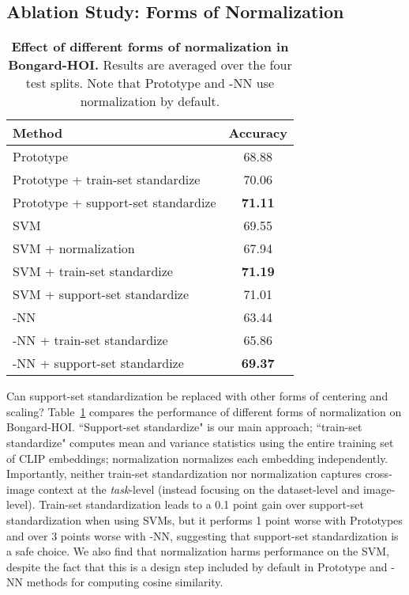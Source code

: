 \subsection{Ablation Study: Forms of Normalization}
\begin{table}
  \centering
    \begin{tabular}{lc}
    \toprule
    Method & Accuracy \\
    \midrule
    Prototype & 68.88  \\
    Prototype + train-set standardize &   70.06  \\
    Prototype + support-set standardize &  \textbf{71.11}  \\
    \midrule
    SVM & 69.55 \\
    SVM +  normalization & 67.94 \\
    SVM + train-set standardize & \textbf{71.19} \\
    SVM + support-set standardize & 71.01 \\
    \midrule
    -NN & 63.44 \\
    -NN + train-set standardize & 65.86 \\
    -NN + support-set standardize & \textbf{69.37} \\
    \bottomrule
  \end{tabular}
    \caption{\textbf{Effect of different forms of normalization in Bongard-HOI.} Results are averaged over the four test splits. Note that Prototype and -NN use  normalization by default. 
    }
  \label{tab:norm}


\end{table}

Can support-set standardization be replaced with other forms of centering and scaling?  
Table~\ref{tab:norm} compares the performance of different forms of normalization on Bongard-HOI. ``Support-set standardize" is our main approach; ``train-set standardize" computes mean and variance statistics using the entire training set of CLIP embeddings;  normalization normalizes each embedding independently.
Importantly, neither train-set standardization nor  normalization captures cross-image context at the \textit{task}-level (instead focusing on the dataset-level and image-level).
Train-set standardization leads to a 0.1 point gain over support-set standardization when using SVMs, but it performs 1 point worse with Prototypes and over 3 points worse with -NN, suggesting that support-set standardization is a safe choice. We also find that  normalization harms performance on the SVM, despite the fact that this is a design step included by default in Prototype and -NN methods for computing cosine similarity.
